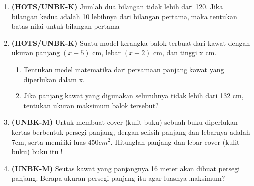\documentclass[12pt,a4paper,draft,final,oneside,twoside,openright,openany]{article}
\begin{document}
\begin{enumerate}
		\item \textbf{(HOTS/UNBK-K)} Jumlah dua bilangan tidak lebih dari 120. Jika bilangan kedua adalah 10 lebihnya dari bilangan pertama, maka tentukan batas nilai untuk bilangan pertama
		
		\item \textbf{(HOTS/UNBK-K)}  Suatu model kerangka balok terbuat dari kawat dengan ukuran panjang $(x + 5)$ cm, lebar $(x-2)$ cm, dan tinggi x cm.
		\begin{enumerate}
			\item Tentukan model matematika dari persamaan panjang kawat yang diperlukan dalam x.
			\item Jika panjang kawat yang digunakan seluruhnya tidak lebih dari 132 cm, tentukan ukuran maksimum balok tersebut?
		\end{enumerate}
		\item  \textbf{(UNBK-M)} Untuk membuat cover (kulit buku) sebuah buku diperlukan kertas berbentuk persegi panjang, dengan selisih panjang dan lebarnya adalah 7cm, serta memiliki luas 450$cm^2$. Hitunglah panjang dan lebar cover (kulit buku) buku itu !
		\item\textbf{(UNBK-M)} Seutas kawat yang panjangnya 16 meter akan dibuat persegi panjang. Berapa ukuran persegi panjang itu agar luasnya maksimum?
		\end{enumerate}
		
\end{document}
